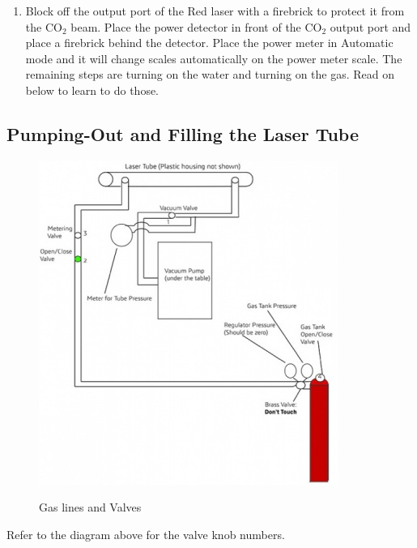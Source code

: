 \documentclass{../lab}
\begin{document}
\begin{enumerate}
    \item Block off the output port of the Red laser with a firebrick to protect it from the CO$_2$ beam. Place the power detector in front of the CO$_2$ output port and place a firebrick behind the detector. Place the power meter in Automatic mode and it will change scales automatically on the power meter scale. The remaining steps are turning on the water and turning on the gas. Read on below to learn to do those.

\end{enumerate}

\subsection{Pumping-Out and Filling the Laser Tube}

\begin{figure}[h]
    \centering
    \href{http://experimentationlab.berkeley.edu/sites/default/files/upimages/lasergaspic_small.jpg}{\includegraphics[width=0.5\linewidth]{images/lasergaspic_small.jpg}}
    \caption{Gas lines and Valves}
    \label{fig:GasLinesAndValves}
\end{figure}
 
Refer to the diagram above for the valve knob numbers.

\newpage
\end{document}

